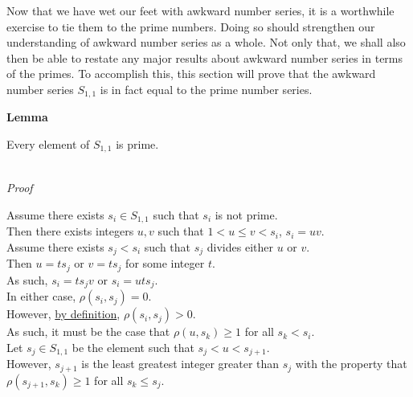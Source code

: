 \documentclass[a4paper,12pt]{article}
\begin{document}
\noindent Now that we have wet our feet with awkward number series, it is a worthwhile exercise to tie them to the prime numbers. Doing so should strengthen our understanding of awkward number series as a whole. Not only that, we shall also then be able to restate any major results about awkward number series in terms of the primes. To accomplish this, this section will prove that the awkward number series $S_{1, 1}$ is in fact equal to the prime number series.\\


\label{lemma:asn_subset_prime}
\hypertarget{lemma:asn_subset_prime}{}
\begin{tcolorbox}
\textbf{Lemma}

Every element of $S_{1, 1}$ is prime. 
\end{tcolorbox}

\noindent \\
\textit{Proof}

\noindent Assume there exists $s_i \in S_{1, 1}$ such that $s_i$ is not prime.\\

\noindent Then there exists integers $u, v$ such that $1 < u \leq v < s_i$, $s_i = uv$.\\

\noindent Assume there exists $s_j < s_i$ such that $s_j$ divides either $u$ or $v$.\\

\noindent Then $u = ts_j$ or $v = ts_j$ for some integer $t$.\\

\noindent As such, $s_i = ts_jv$ or $s_i = uts_j$.\\

\noindent In either case, $\rho(s_i, s_j) = 0$.\\

\noindent However, \hyperlink{definition:awkward_number_series}{by definition}, $\rho(s_i, s_j) > 0$.\\

\noindent As such, it must be the case that $\rho(u, s_k) \geq 1$ for all $s_k < s_i$.\\

\noindent Let $s_j \in S_{1, 1}$ be the element such that $s_j < u < s_{j + 1}$.\\

\noindent However, $s_{j + 1}$ is the least greatest integer greater than $s_j$ with the property that $\rho(s_{j + 1}, s_k) \geq 1$ for all $s_k \leq s_j$.\\
\end{document}
